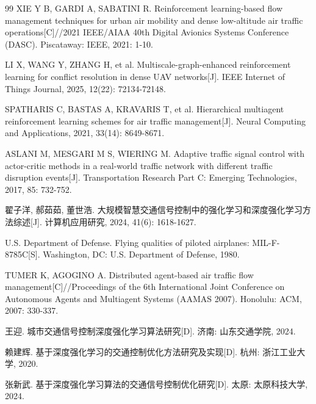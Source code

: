 \documentclass[12pt,a4paper,UTF8]{ctexart}
\begin{document}
\begin{thebibliography}{99}
 XIE Y B, GARDI A, SABATINI R. Reinforcement learning-based flow management techniques for urban air mobility and dense low-altitude air traffic operations[C]//2021 IEEE/AIAA 40th Digital Avionics Systems Conference (DASC). Piscataway: IEEE, 2021: 1-10.

 LI X, WANG Y, ZHANG H, et al. Multiscale-graph-enhanced reinforcement learning for conflict resolution in dense UAV networks[J]. IEEE Internet of Things Journal, 2025, 12(22): 72134-72148.

 SPATHARIS C, BASTAS A, KRAVARIS T, et al. Hierarchical multiagent reinforcement learning schemes for air traffic management[J]. Neural Computing and Applications, 2021, 33(14): 8649-8671.

 ASLANI M, MESGARI M S, WIERING M. Adaptive traffic signal control with actor-critic methods in a real-world traffic network with different traffic disruption events[J]. Transportation Research Part C: Emerging Technologies, 2017, 85: 732-752.

 翟子洋, 郝茹茹, 董世浩. 大规模智慧交通信号控制中的强化学习和深度强化学习方法综述[J]. 计算机应用研究, 2024, 41(6): 1618-1627.

 U.S. Department of Defense. Flying qualities of piloted airplanes: MIL-F-8785C[S]. Washington, DC: U.S. Department of Defense, 1980.

 TUMER K, AGOGINO A. Distributed agent-based air traffic flow management[C]//Proceedings of the 6th International Joint Conference on Autonomous Agents and Multiagent Systems (AAMAS 2007). Honolulu: ACM, 2007: 330-337.

 王迎. 城市交通信号控制深度强化学习算法研究[D]. 济南: 山东交通学院, 2024.

 赖建辉. 基于深度强化学习的交通控制优化方法研究及实现[D]. 杭州: 浙江工业大学, 2020.

 张新武. 基于深度强化学习算法的交通信号控制优化研究[D]. 太原: 太原科技大学, 2024.


\end{thebibliography}
\end{document}
